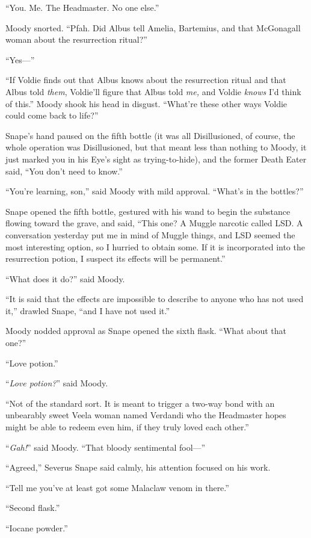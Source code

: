 “You. Me. The Headmaster. No one else.”

Moody snorted. “Pfah. Did Albus tell Amelia, Bartemius, and that McGonagall woman about the resurrection ritual?”

“Yes—”

“If Voldie finds out that Albus knows about the resurrection ritual and that Albus told \emph{them}, Voldie’ll figure that Albus told \emph{me,} and Voldie \emph{knows} I’d think of this.” Moody shook his head in disgust. “What’re these other ways Voldie could come back to life?”

Snape’s hand paused on the fifth bottle (it was all Disillusioned, of course, the whole operation was Disillusioned, but that meant less than nothing to Moody, it just marked you in his Eye’s sight as trying-to-hide), and the former Death Eater said, “You don’t need to know.”

“You’re learning, son,” said Moody with mild approval. “What’s in the bottles?”

Snape opened the fifth bottle, gestured with his wand to begin the substance flowing toward the grave, and said, “This one? A Muggle narcotic called LSD. A conversation yesterday put me in mind of Muggle things, and LSD seemed the most interesting option, so I hurried to obtain some. If it is incorporated into the resurrection potion, I suspect its effects will be permanent.”

“What does it do?” said Moody.

“It is said that the effects are impossible to describe to anyone who has not used it,” drawled Snape, “and I have not used it.”

Moody nodded approval as Snape opened the sixth flask. “What about that one?”

“Love potion.”

“\emph{Love potion?}” said Moody.

“Not of the standard sort. It is meant to trigger a two-way bond with an unbearably sweet Veela woman named Verdandi who the Headmaster hopes might be able to redeem even him, if they truly loved each other.”

“\emph{Gah!}” said Moody. “That bloody sentimental fool—”

“Agreed,” Severus Snape said calmly, his attention focused on his work.

“Tell me you’ve at least got some Malaclaw venom in there.”

“Second flask.”

“Iocane powder.”

